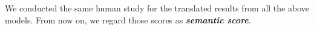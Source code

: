 


We conducted the same human study for the translated results from all the above models. From now on, we regard those scores as \textbf{{\em
    semantic score}}.





